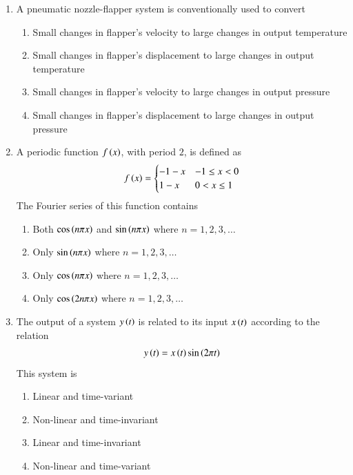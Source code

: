 \documentclass[journal,12pt,onecolumn]{IEEEtran}
\theoremstyle{remark}
\begin{document}
\begin{enumerate}
\item A pneumatic nozzle-flapper system is conventionally used to convert

\hfill{}
\begin{enumerate}
\item Small changes in flapper's velocity to large changes in output temperature
\item Small changes in flapper's displacement to large changes in output temperature
\item Small changes in flapper's velocity to large changes in output pressure
\item Small changes in flapper's displacement to large changes in output pressure
\end{enumerate}

\item A periodic function $f\left(x\right)$, with period $2$, is defined as
\begin{align*}
f\left(x\right) = \begin{cases} -1 - x & -1 \le x < 0 \\ 1 - x & 0 < x \le 1 \end{cases}
\end{align*}
The Fourier series of this function contains \underline{\hspace{2cm}}

\hfill{}
\begin{enumerate}
\item Both $\cos \left(n\pi x\right)$ and $\sin \left(n\pi x\right)$ where $n = 1, 2, 3, \ldots$
\item Only $\sin \left(n\pi x\right)$ where $n = 1, 2, 3, \ldots$
\item Only $\cos \left(n\pi x\right)$ where $n = 1, 2, 3, \ldots$
\item Only $\cos \left(2n\pi x\right)$ where $n = 1, 2, 3, \ldots$
\end{enumerate}

\item The output of a system $y\left(t\right)$ is related to its input $x\left(t\right)$ according to the relation
\begin{align*}
y\left(t\right) = x\left(t\right) \sin\left(2\pi t\right)
\end{align*}
This system is \underline{\hspace{2cm}}

\hfill{}
\begin{enumerate}
\item Linear and time-variant
\item Non-linear and time-invariant
\item Linear and time-invariant
\item Non-linear and time-variant
\end{enumerate}


\end{enumerate}
\end{document}
